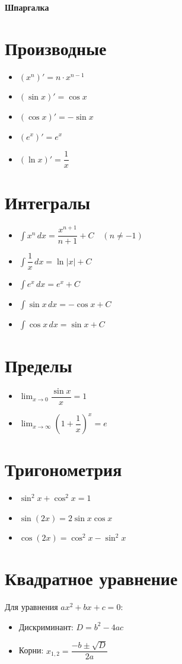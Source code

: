 \documentclass[12pt]{article}
\begin{document}
\begin{center}
    \Huge\textbf{Шпаргалка}
\end{center}

\section*{Производные}
\begin{itemize}
    \item $(x^n)' = n \cdot x^{n-1}$
    \item $(\sin x)' = \cos x$
    \item $(\cos x)' = -\sin x$
    \item $(e^x)' = e^x$
    \item $(\ln x)' = \dfrac{1}{x}$
\end{itemize}

\section*{Интегралы}
\begin{itemize}
    \item $\int x^n \, dx = \dfrac{x^{n+1}}{n+1} + C \quad (n \neq -1)$
    \item $\int \dfrac{1}{x} \, dx = \ln|x| + C$
    \item $\int e^x \, dx = e^x + C$
    \item $\int \sin x \, dx = -\cos x + C$
    \item $\int \cos x \, dx = \sin x + C$
\end{itemize}

\section*{Пределы}
\begin{itemize}
    \item $\lim_{x \to 0} \dfrac{\sin x}{x} = 1$
    \item $\lim_{x \to \infty} \left(1 + \dfrac{1}{x}\right)^x = e$
\end{itemize}

\section*{Тригонометрия}
\begin{itemize}
    \item $\sin^2 x + \cos^2 x = 1$
    \item $\sin(2x) = 2 \sin x \cos x$
    \item $\cos(2x) = \cos^2 x - \sin^2 x$
\end{itemize}

\section*{Квадратное уравнение}
Для уравнения $ax^2 + bx + c = 0$:
\begin{itemize}
    \item Дискриминант: $D = b^2 - 4ac$
    \item Корни: $x_{1,2} = \dfrac{-b \pm \sqrt{D}}{2a}$
\end{itemize}
\end{document}
